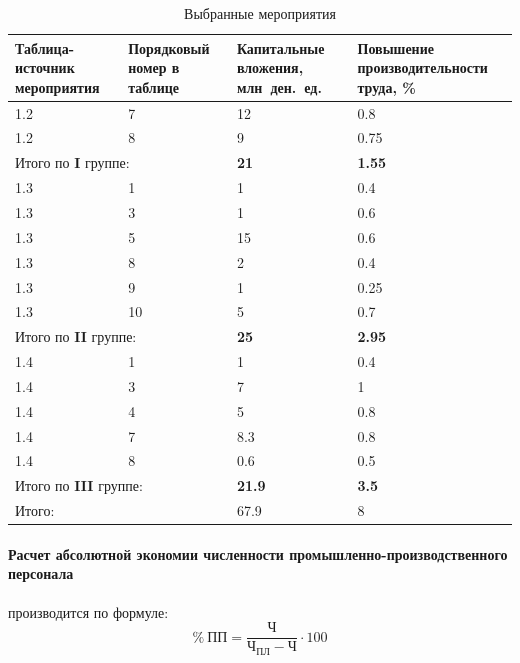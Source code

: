 \begin{table}[htbp]
  \caption{Выбранные мероприятия\label{tbl:solution}}
  \centering
    \begin{tabular}{| m{3cm} | m{3cm} | m{3.5cm} | m{4.5cm} |}
      \hline
      Таблица-источник мероприятия & Порядковый номер \newline в таблице & Капитальные \newline вложения, млн~ден.~ед. & Повышение \newline производительности труда, \% \\ \hline
      1.2 & 7 & 12 & 0.8 \\ \hline
      1.2 & 8 & 9 & 0.75 \\ \hline
      \multicolumn{2}{|l|}{Итого по \textbf{I} группе:} & \textbf{21} & \textbf{1.55} \\ \hline
      1.3 & 1 & 1 & 0.4 \\ \hline
      1.3 & 3 & 1 & 0.6 \\ \hline
      1.3 & 5 & 15 & 0.6 \\ \hline
      1.3 & 8 & 2 & 0.4 \\ \hline
      1.3 & 9 & 1 & 0.25 \\ \hline
      1.3 & 10 & 5 & 0.7 \\ \hline
      \multicolumn{2}{|l|}{Итого по \textbf{II} группе:} & \textbf{25} & \textbf{2.95} \\ \hline
      1.4 & 1 & 1 & 0.4 \\ \hline
      1.4 & 3 & 7 & 1 \\ \hline
      1.4 & 4 & 5 & 0.8 \\ \hline
      1.4 & 7 & 8.3 & 0.8 \\ \hline
      1.4 & 8 & 0.6 & 0.5 \\ \hline
      \multicolumn{2}{|l|}{Итого по \textbf{III} группе:} & \textbf{21.9} & \textbf{3.5} \\ \hline
      \multicolumn{2}{|l|}{Итого:} & 67.9 & 8 \\ \hline
    \end{tabular}
\end{table}

\paragraph{Расчет абсолютной экономии численности промышленно-производственного
 персонала} производится по формуле:
\begin{equation}
\% ~ \text{ПП} = \dfrac{\text{Ч}}{\text{Ч}_{\text{ПЛ}} - \text{Ч}} \cdot 100
\end{equation}

